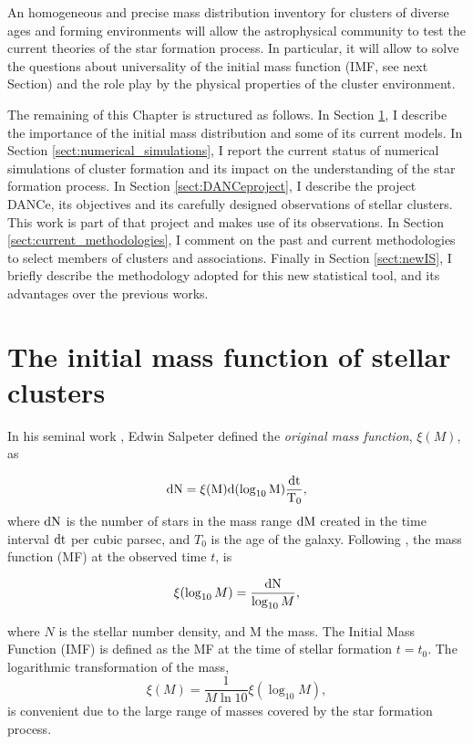 An homogeneous and precise mass distribution inventory for clusters of diverse ages and forming environments will allow the astrophysical community to test the current theories of the star formation process. In particular, it will allow to solve the questions about universality of the initial mass function (IMF, see next Section) and the role play by the physical properties of the cluster environment.    

The remaining of this Chapter is structured as follows. In Section \ref{sect:IMF}, I describe the importance of the initial mass distribution and some of its current models. In Section \ref{sect:numerical_simulations}, I report the current status of numerical simulations of cluster formation and its impact on the understanding of the star formation process. In Section \ref{sect:DANCeproject}, I describe the project DANCe, its objectives and its carefully designed observations of stellar clusters. This work is part of that project and makes use of its observations. In Section \ref{sect:current_methodologies}, I comment on the past and current methodologies to select members of clusters and associations. Finally in Section \ref{sect:newIS}, I briefly describe the methodology adopted for this new statistical tool, and its advantages over the previous works. 

\section{The initial mass function of stellar clusters}
\label{sect:IMF}

In his seminal work \citep{Salpeter1955}, Edwin Salpeter defined the \emph{original mass function}, $\xi(M)$, as

\begin{equation}
\rm{d}N= \xi(M)\rm{d}(\log_{10} M) \frac{\rm{d}t}{T_0},\nonumber
\end{equation}
where $\rm{d}N$ is the number of stars in the mass range $\rm{d}M$ created in the time interval $\rm{d}t$ per cubic parsec, and $T_0$ is the age of the galaxy. Following \citet{Chabrier2003b},  the mass function (MF) at the observed time $t$, is

\begin{equation}
\xi(\log_{10} M)=\frac{\rm{d}N}{\log_{10} M},\nonumber
\end{equation}

where $N$ is the stellar number density, and M the mass. The Initial Mass Function (IMF) is defined as the MF at the time of stellar formation $t=t_0$. The logarithmic transformation of the mass,
\begin{equation}
\xi(M)=\frac{1}{M \ln 10} \xi (\log_{10} M),\nonumber
\end{equation}
is convenient due to the large range of masses covered by the star formation process.

